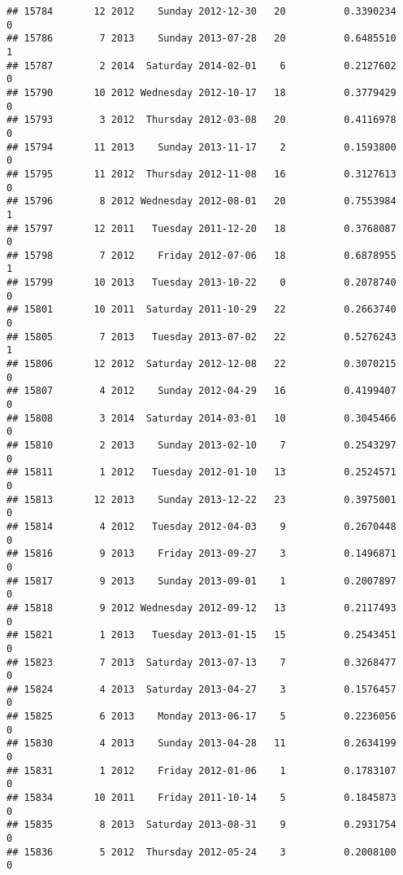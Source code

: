 \documentclass[
]{article}
\begin{document}
\begin{verbatim}
## 15784       12 2012    Sunday 2012-12-30   20          0.3390234             0
## 15786        7 2013    Sunday 2013-07-28   20          0.6485510             1
## 15787        2 2014  Saturday 2014-02-01    6          0.2127602             0
## 15790       10 2012 Wednesday 2012-10-17   18          0.3779429             0
## 15793        3 2012  Thursday 2012-03-08   20          0.4116978             0
## 15794       11 2013    Sunday 2013-11-17    2          0.1593800             0
## 15795       11 2012  Thursday 2012-11-08   16          0.3127613             0
## 15796        8 2012 Wednesday 2012-08-01   20          0.7553984             1
## 15797       12 2011   Tuesday 2011-12-20   18          0.3768087             0
## 15798        7 2012    Friday 2012-07-06   18          0.6878955             1
## 15799       10 2013   Tuesday 2013-10-22    0          0.2078740             0
## 15801       10 2011  Saturday 2011-10-29   22          0.2663740             0
## 15805        7 2013   Tuesday 2013-07-02   22          0.5276243             1
## 15806       12 2012  Saturday 2012-12-08   22          0.3070215             0
## 15807        4 2012    Sunday 2012-04-29   16          0.4199407             0
## 15808        3 2014  Saturday 2014-03-01   10          0.3045466             0
## 15810        2 2013    Sunday 2013-02-10    7          0.2543297             0
## 15811        1 2012   Tuesday 2012-01-10   13          0.2524571             0
## 15813       12 2013    Sunday 2013-12-22   23          0.3975001             0
## 15814        4 2012   Tuesday 2012-04-03    9          0.2670448             0
## 15816        9 2013    Friday 2013-09-27    3          0.1496871             0
## 15817        9 2013    Sunday 2013-09-01    1          0.2007897             0
## 15818        9 2012 Wednesday 2012-09-12   13          0.2117493             0
## 15821        1 2013   Tuesday 2013-01-15   15          0.2543451             0
## 15823        7 2013  Saturday 2013-07-13    7          0.3268477             0
## 15824        4 2013  Saturday 2013-04-27    3          0.1576457             0
## 15825        6 2013    Monday 2013-06-17    5          0.2236056             0
## 15830        4 2013    Sunday 2013-04-28   11          0.2634199             0
## 15831        1 2012    Friday 2012-01-06    1          0.1783107             0
## 15834       10 2011    Friday 2011-10-14    5          0.1845873             0
## 15835        8 2013  Saturday 2013-08-31    9          0.2931754             0
## 15836        5 2012  Thursday 2012-05-24    3          0.2008100             0

\end{verbatim}
\end{document}
